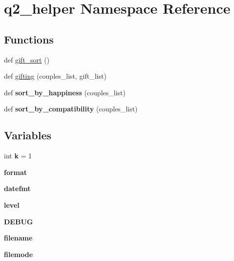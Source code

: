 \hypertarget{namespaceq2__helper}{}\section{q2\+\_\+helper Namespace Reference}
\label{namespaceq2__helper}
\subsection*{Functions}
\begin{DoxyCompactItemize}
\item 
def \hyperlink{namespaceq2__helper_a8b3d3b435300fd1f72d5dcf384d378ae}{gift\+\_\+sort} ()
\item 
def \hyperlink{namespaceq2__helper_ac0013034c33667bd83f64de880d2d177}{gifting} (couples\+\_\+list, gift\+\_\+list)
\item 
\mbox{\label{namespaceq2__helper_aa1be2d7c40a76485c6c99c01d70f7f94}} 
def {\bfseries sort\+\_\+by\+\_\+happiness} (couples\+\_\+list)
\item 
\mbox{\label{namespaceq2__helper_ac8e0cbab1bea854b3f1457f81b26324f}} 
def {\bfseries sort\+\_\+by\+\_\+compatibility} (couples\+\_\+list)
\end{DoxyCompactItemize}
\subsection*{Variables}
\begin{DoxyCompactItemize}
\item 
\mbox{\label{namespaceq2__helper_a707dcdaaab43b6d4969a0cb3cabe7f8d}} 
int {\bfseries k} = 1
\item 
\mbox{\label{namespaceq2__helper_a17733fc799bfce7e94f29dc9f8d0538e}} 
{\bfseries format}
\item 
\mbox{\label{namespaceq2__helper_ae8d3b2c21f94189201a72219b15efff5}} 
{\bfseries datefmt}
\item 
\mbox{\label{namespaceq2__helper_a6bf9379ce8dbb3cbe4e6cce5844d5be2}} 
{\bfseries level}
\item 
\mbox{\label{namespaceq2__helper_a3ff914f74a8a008805e4f07bda9723d6}} 
{\bfseries D\+E\+B\+UG}
\item 
\mbox{\label{namespaceq2__helper_a576aee952f4e47794fcdb43c4aebeb49}} 
{\bfseries filename}
\item 
\mbox{\label{namespaceq2__helper_a7d612174511c4ec56695533c317cfdc6}} 
{\bfseries filemode}
\end{DoxyCompactItemize}


